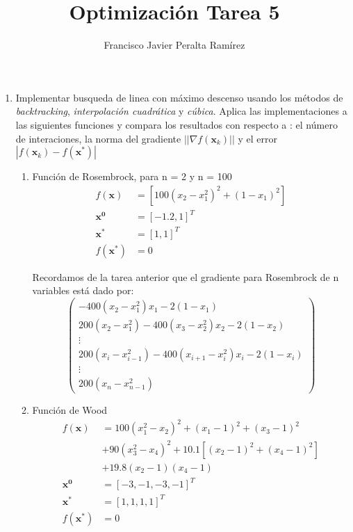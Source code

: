 \documentclass[10pt,twocolumn]{article}
\title {Optimización Tarea 5}
\author {Francisco Javier Peralta Ramírez}
\begin{document}
\maketitle
\begin{enumerate}

\item Implementar busqueda de linea con máximo descenso usando los métodos de \emph{backtracking}, \emph{interpolación cuadrática} y \emph{cúbica}. Aplica las implementaciones a las siguientes funciones y compara los resultados con respecto a : el número de interaciones, la norma del gradiente $||\nabla f(\boldsymbol{x}_k)||$ y el error $|f(\boldsymbol{x}_k) - f(\boldsymbol{x}^*)|$

\begin{enumerate}
\item Función de Rosembrock, para n = 2 y n = 100
\vspace{-2ex}
\begin{align*}
f(\boldsymbol{x}) &= [100 (x_2 - x_1^2)^2 + (1 - x_1)^2] \\
\boldsymbol{x^0} &= [-1.2, 1]^T \\
\boldsymbol{x^*} &= [1, 1]^T \\
f(\boldsymbol{x^*}) &= 0
\end{align*}

Recordamos de la tarea anterior que el gradiente para Rosembrock de n variables está dado por:
\vspace{-1ex}
$$
 \begin{pmatrix}
  -400(x_2 - x_1^2)x_1 - 2(1 - x_1) \\
  200(x_2 - x_1^2) - 400(x_3 - x_2^2)x_2 - 2(1 - x_2)\\
  \vdots\\
  200(x_{i} - x_{i-1}^2) - 400(x_{i+1} - x_i^2)x_i - 2(1 - x_i)\\
  \vdots\\
  200(x_{n} - x_{n-1}^2)
 \end{pmatrix}
$$

\newpage
\item Función de Wood
\vspace{-1ex}
\begin{align*} 
f(\boldsymbol{x}) &= 100(x_1^2-x_2)^2 +(x_1-1)^2+(x_3-1)^2\\
&+90(x_3^2-x_4)^2+10.1[(x_2-1)^2+(x_4-1)^2]\\
&+19.8(x_2-1)(x_4-1) \\
\boldsymbol{x^0} &= [-3, -1, -3, -1]^T \\
\boldsymbol{x^*} &= [1, 1, 1, 1]^T \\
f(\boldsymbol{x^*}) &= 0
\end{align*}

\end{enumerate}

\end{enumerate}
\end{document}
